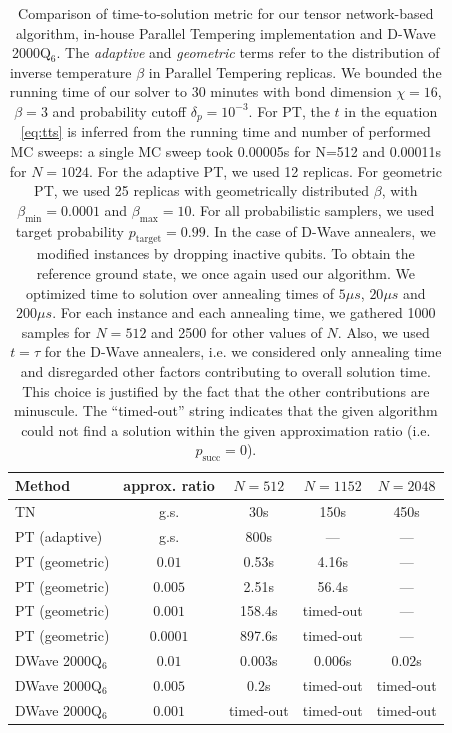 \begin{table}[b]
  \centering
  \begin{tabular}{|l|c|ccc|}
    \hline
    \rowcolor{theader}  Method & approx. ratio & $N=512$   & $N=1152$  & $N=2048$  \\
    \hline
    TN                         & g.s.          & 30s       & 150s      & 450s      \\
    \hline
    \hline
    PT (adaptive)              & g.s.          & 800s      & ---       & ---       \\
    \hline
    PT (geometric)             & $0.01$        & 0.53s     & 4.16s     & ---       \\
    PT (geometric)             & $0.005$       & 2.51s     & 56.4s     & ---       \\
    PT (geometric)             & $0.001$       & 158.4s    & timed-out & ---       \\
    PT (geometric)             & $0.0001$      & 897.6s    & timed-out & ---       \\
    \hline
    \hline
    DWave 2000Q$_6$            & $0.01$        & $0.003$s  & $0.006$s  & $0.02$s   \\
    DWave 2000Q$_6$            & $0.005$       & $0.2$s    & timed-out & timed-out \\
    DWave 2000Q$_6$            & $0.001$       & timed-out & timed-out & timed-out \\
    \hline
    \hline
  \end{tabular}
  \caption{Comparison of time-to-solution metric for our tensor network-based algorithm,
    in-house Parallel Tempering implementation and D-Wave 2000Q$_{6}$. The
    \emph{adaptive} and \emph{geometric} terms refer to the distribution of inverse
    temperature $\beta$ in Parallel Tempering replicas. We bounded the running time of
    our solver to 30 minutes with bond dimension $\chi = 16$, $\beta=3$ and
    probability cutoff $\delta_{p} = 10^{-3}$. For PT, the $t$ in the equation
    \ref{eq:tts} is inferred from the running time and number of performed MC
    sweeps:  a single MC sweep took 0.00005s for N=512 and 0.00011s
    for $N=1024$. For the adaptive PT, we used 12 replicas. For geometric PT, we
    used 25 replicas with geometrically distributed $\beta$, with
    $\beta_{\min}=0.0001$ and $\beta_{\max}=10$. For all probabilistic samplers, we
    used target probability $p_{\mbox{target}}=0.99$. In the case of D-Wave
    annealers, we modified instances by dropping inactive qubits. To obtain the
    reference ground state, we once again used our algorithm. We optimized time to
    solution over annealing times of $5\mu s$, $20\mu s$ and $200\mu s$. For each instance and each
    annealing time, we gathered 1000 samples for $N=512$ and 2500 for other values
    of $N$. Also, we used $t=\tau$ for the D-Wave annealers, i.e. we considered only
    annealing time and disregarded other factors contributing to overall solution time.
    This choice is justified by the fact that the other contributions are minuscule.
    The ``timed-out'' string indicates that the given algorithm could not
    find a solution within the given approximation ratio (i.e. $p_{\mbox{succ}}=0$). }
  \label{tab:tnvspt}
\end{table}

